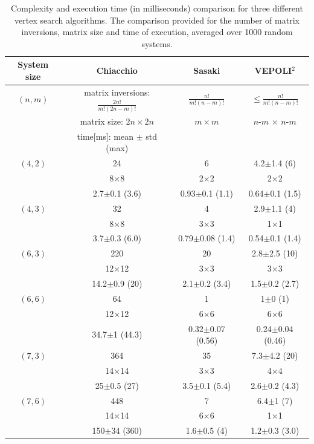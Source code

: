 \begin{table}[!h]
    \centering
    \begin{tabular}{|c|c|c|c|}
       \hline
      \textbf{ System size }& \textbf{Chiacchio}\cite{chiacchio_evaluation_1996} & \textbf{Sasaki} \cite{sasaki2011vertex}  &  \textbf{VEPOLI$^2$} \\
       \hline
       $(n,m)$& matrix inversions: $ \frac{2n!}{m!(2n-m)!}$  & $ \frac{n!}{m!(n-m)!} $ & $ \leq \frac{n!}{m!(n-m)!}$ \\
       &  matrix size:  $ 2n \times 2n$ & $m\times m$  & $n$-$m$ $\times$ $n$-$m$\\
       & time[ms]: mean $\pm$ std (max) & & \\
       \hline
       $(4,2)$ &  24 & 6 & 4.2$\pm$1.4 (6) \\ 
       & 8$\times$8 & 2$\times$2 & 2$\times$2 \\ 
       & 2.7$\pm$0.1 (3.6) & 0.93$\pm$0.1 (1.1) & 0.64$\pm$0.1 (1.5) \\ 
       \hline
       $(4,3)$ &  32 & 4 & 2.9$\pm$1.1 (4) \\ 
       & 8$\times$8 & 3$\times$3 & 1$\times$1 \\ 
       & 3.7$\pm$0.3 (6.0) & 0.79$\pm$0.08 (1.4) & 0.54$\pm$0.1 (1.4) \\ 
       \hline
       $(6,3)$ & 220 & 20 & 2.8$\pm$2.5 (10) \\ 
        & 12$\times$12 & 3$\times$3 & 3$\times$3 \\ 
       & 14.2$\pm$0.9 (20) & 2.1$\pm$0.2 (3.4) & 1.5$\pm$0.2 (2.7) \\ 
       \hline
      $(6,6)$&   64 & 1 & 1$\pm$0 (1)\\
        &  12$\times$12 & 6$\times$6 & 6$\times6$\\
       & 34.7$\pm$1 (44.3) & 0.32$\pm$0.07 (0.56) & 0.24$\pm$0.04 (0.46)\\
       \hline
      $(7,3)$&    364 & 35 & 7.3$\pm$4.2 (20)\\
        & 14$\times$14 & 3$\times$3 & 4$\times4$\\
       & 25$\pm$0.5 (27) & 3.5$\pm$0.1 (5.4) & 2.6$\pm$0.2 (4.3)\\
       \hline
      $(7,6)$& 448 & 7 & 6.4$\pm$1 (7)\\
        & 14$\times$14 & 6$\times$6 & 1$\times$1\\
       & 150$\pm$34 (360) & 1.6$\pm$0.5 (4) & 1.2$\pm$0.3 (3.0)\\
       \hline
    \end{tabular}
    \caption{Complexity and execution time (in milliseconds) comparison for three different vertex search algorithms. The comparison provided for the number of matrix inversions, matrix size and time of execution, averaged over 1000 random systems. }
    \label{tab:complexity_results}
\end{table}

